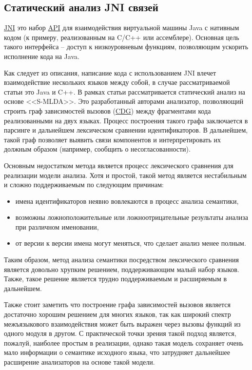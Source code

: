 \subsection{Статический анализ JNI связей} \label{ssec:jni}

\hyperlink{JNI}{JNI} \cite{JNI} это набор \hyperlink{API}{API} для взаимодействия виртуальной машины Java
с нативным кодом (к примеру, реализованным на C/C++ или ассемблере). Основная цель такого интерфейса --
доступ к низкоуровневым функциям, позволяющим ускорить исполнение кода на Java.

Как следует из описания, написание кода с использованием JNI влечет взаимодействие нескольких языков между
собой, в случае рассматриваемой статьи это Java и C++. В рамках статьи рассматривается статический анализ
на основе <<S-MLDA>>. Это разработанный авторами анализатор, позволяющий строить граф зависимостей вызовов 
(\hyperlink{CDG}{CDG}) между фрагментами кода реализованными на двух языках. Процесс построения такого
графа заключается в парсинге и дальнейшем лексическом сравнении идентификаторов. В дальнейшем, такой
граф позволяет выявить связи компонентов и интерпретировать их должным образом (например, сообщить о 
несогласованности).

Основным недостатком метода является процесс лексического сравнения для реализации модели анализа.
Хотя и простой, такой метод является нестабильным и сложно поддерживаемым по следующим причинам:
\begin{itemize}
    \item имена идентификаторов неявно вовлекаются в процесс анализа семантики,
    \item возможны ложноположительные или ложноотрицательные результаты анализа при различном именовании,
    \item от версии к версии имена могут меняться, что сделает анализ менее полным.
\end{itemize}

Таким образом, метод анализа семантики посредством лексического сравнения является
довольно хрупким решением, поддерживающим малый набор языков. Также, такое решение является трудно поддерживаемым
и расширяемым в дальнейшем. 

Также стоит заметить что построение графа зависимостей вызовов является достаточно хорошим решением для многих
языков, так как широкий спектр межъязыкового взаимодействия может быть выражен через вызовы функций из одного
модуля в другом. С практической точки зрения такой подход является, пожалуй, наиболее простым в реализации, однако
такая модель сохраняет очень мало информации о семантике исходного языка, что затрудняет дальнейшее расширение
анализаторов на основе такой модели.


